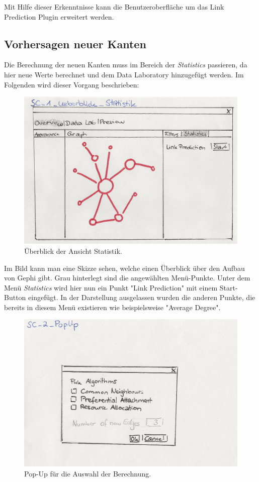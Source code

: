 Mit Hilfe dieser Erkenntnisse kann die Benutzeroberfläche um das Link Prediction Plugin erweitert werden.

\subsection{Vorhersagen neuer Kanten}

Die Berechnung der neuen Kanten muss im Bereich der \textit{Statistics} passieren, da hier neue Werte berechnet und dem
Data Laboratory hinzugefügt werden. Im Folgenden wird dieser Vorgang beschrieben:

\begin{figure}[htbp]
    \includegraphics[width=\linewidth]{resources/SC-1.png}
    \caption{Überblick der Ansicht Statistik.}
    \label{fig:screen1}
\end{figure}

Im Bild kann man eine Skizze sehen, welche einen Überblick über den Aufbau von Gephi gibt. Grau hinterlegt sind die
angewählten Menü-Punkte. Unter dem Menü \textit{Statistics} wird hier nun ein Punkt "Link Prediction" mit einem
Start-Button eingefügt. In der Darstellung ausgelassen wurden die anderen Punkte, die bereits in diesem Menü existieren
wie beispielsweise "Average Degree".

\begin{figure}[htbp]
    \includegraphics[width=\linewidth]{resources/SC-2.png}
    \caption{Pop-Up für die Auswahl der Berechnung.}
    \label{fig:screen2}
\end{figure}

